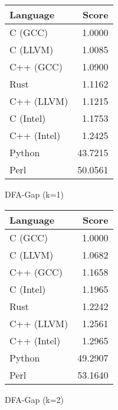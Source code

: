 \begin{subtable}{0.33\textwidth}
    \centering
    \begin{tabular}{|l|r|}
        \hline
        Language & Score \\
        \hline
        C (GCC) & 1.0000 \\
        C (LLVM) & 1.0085 \\
        C++ (GCC) & 1.0900 \\
        Rust & 1.1162 \\
        C++ (LLVM) & 1.1215 \\
        C (Intel) & 1.1753 \\
        C++ (Intel) & 1.2425 \\
        Python & 43.7215 \\
        Perl & 50.0561 \\
        \hline
    \end{tabular}
    \caption{DFA-Gap (k=1)}
    \label{table:runtime:dfa_gap(1)}
\end{subtable}%
\begin{subtable}{0.33\textwidth}
    \centering
    \begin{tabular}{|l|r|}
        \hline
        Language & Score \\
        \hline
        C (GCC) & 1.0000 \\
        C (LLVM) & 1.0682 \\
        C++ (GCC) & 1.1658 \\
        C (Intel) & 1.1965 \\
        Rust & 1.2242 \\
        C++ (LLVM) & 1.2561 \\
        C++ (Intel) & 1.2965 \\
        Python & 49.2907 \\
        Perl & 53.1640 \\
        \hline
    \end{tabular}
    \caption{DFA-Gap (k=2)}
    \label{table:runtime:dfa_gap(2)}
\end{subtable}
